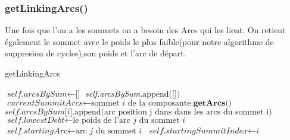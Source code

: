 \documentclass[a4paper]{article}
\begin{document}
\subsubsection{getLinkingArcs()}
Une fois que l'on a les sommets on a besoin des Arcs qui les lient. On retient également le  sommet avec le poids le plus faible(pour notre algorithme de suppresion de cycles),son poids et l'arc de départ. 
\begin{algorithm}[H]
\caption{getLinkingArcs}\label{Link}
\begin{algorithmic}[1]
\State $\textit{self.arcsBySum}\gets \text{[]}$
\State \textit{self.arcsBySum}$\text{.append([])}$
\State $\textit{currentSummitArcs}\gets \text{sommet}\textit{ i }\text{de la composante}\textbf{.getArcs()}$
\State $\textit{self.arcsBySum[i]}\text{.append(arc position j dans dans les arcs du sommet i)}$
\State $\textit{self.lowestDebt} \gets \text{le poids de l'arc } \textit{j}\text{ du sommet }\textit{i}$
\State $\textit{self.startingArc}\gets \text{arc }\textit{j} \text{ du sommet }\textit{i}$
\State $\textit{self.startingSummitIndex}\gets\textit{i}$
\EndIf
\EndIf
\EndFor
\EndFor
\EndProcedure
\end{algorithmic}
\end{algorithm}
\end{document}
